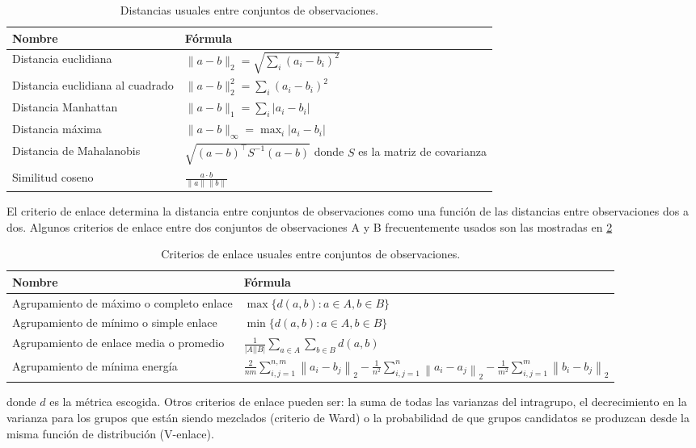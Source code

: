 \begin{table}[h]
	\centering
	\begin{tabular}{m{6cm} m{6cm}  }
		\toprule
		\textbf{Nombre} & \textbf{Fórmula}\\
		\midrule
		 Distancia euclidiana & $\|a-b\|_{2}=\sqrt{\sum_{i}\left(a_{i}-b_{i}\right)^{2}}$\\
		\hline 
		Distancia euclidiana al cuadrado & $\|a-b\|_{2}^{2}=\sum_{i}\left(a_{i}-b_{i}\right)^{2}$ \\
		\hline 
		Distancia Manhattan & $\|a-b\|_{1}=\sum_{i}\left|a_{i}-b_{i}\right|$ \\
		\hline 
		Distancia máxima & $\|a-b\|_{\infty}=\max _{i}\left|a_{i}-b_{i}\right|$ \\
		\hline 
		Distancia de Mahalanobis & $\sqrt{(a-b)^{\top} S^{-1}(a-b)}$ donde $S$ es la matriz de covarianza \\
		\hline 
		Similitud coseno & $\frac{a \cdot b}{\|a\| \|b\|}$ \\
		\bottomrule
		\hline
	\end{tabular}
	\caption{Distancias usuales entre conjuntos de observaciones.}
	\label{tab:metricsDendrograma}
\end{table}
El criterio de enlace determina la distancia entre conjuntos de observaciones como una función de las distancias entre observaciones dos a dos. Algunos criterios de enlace entre dos conjuntos de observaciones A y B frecuentemente usados son las mostradas en \cref{tab:critEnlance}
\begin{table}[h]
	\centering
	\begin{tabular}{m{8cm} m{8cm}  }
		\toprule
		\textbf{Nombre} & \textbf{Fórmula}\\
		\midrule
		Agrupamiento de máximo o completo enlace & $\max \{d(a, b): a \in A, b \in B\}$ \\
		\hline
		Agrupamiento de mínimo o simple enlace & $\min \{d(a, b): a \in A, b \in B\}$ \\
		\hline
		Agrupamiento de enlace media o promedio & $\frac{1}{|A||B|} \sum_{a \in A} \sum_{b \in B} d(a, b)$ \\
		\hline
		Agrupamiento de mínima energía & \parbox[t]{8cm}{
			$\frac{2}{n m} \sum_{i,j=1}^{n,m}\left\|a_{i}-b_{j}\right\|_{2} -
			\frac{1}{n^{2}} \sum_{i,j=1}^{n}\left\|a_{i}-a_{j}\right\|_{2}-
			\frac{1}{m^{2}} \sum_{i, j=1}^{m}\left\|b_{i}-b_{j}\right\|_{2}$
		} \\
		\bottomrule
		\hline
	\end{tabular}
	\caption{Criterios de enlace usuales entre conjuntos de observaciones.}
	\label{tab:critEnlance}
\end{table}
donde $d$ es la métrica escogida. Otros criterios de enlace pueden ser: la suma de todas las varianzas del intragrupo, el decrecimiento en la varianza para los grupos que están siendo mezclados (criterio de Ward) o la probabilidad de que grupos candidatos se produzcan desde la misma función de distribución (V-enlace).

